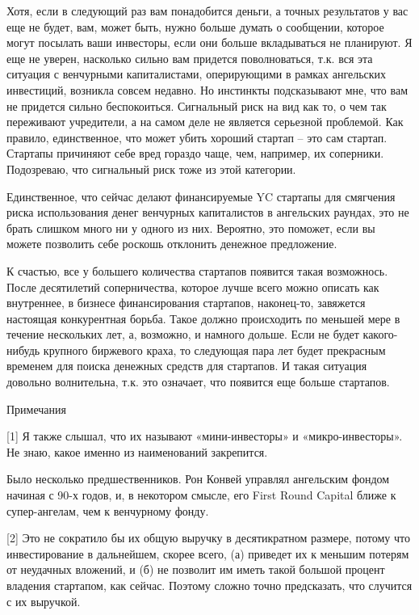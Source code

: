 \documentclass[ebook,12pt,oneside,openany]{memoir}
\begin{document}
Хотя, если в следующий раз вам понадобится деньги, а точных
результатов у вас еще не будет, вам, может быть, нужно больше думать о
сообщении, которое могут посылать ваши инвесторы, если они больше
вкладываться не планируют. Я еще не уверен, насколько сильно вам
придется поволноваться, т.к. вся эта ситуация с венчурными
капиталистами, оперирующими в рамках ангельских инвестиций, возникла
совсем недавно. Но инстинкты подсказывают мне, что вам не придется
сильно беспокоиться. Сигнальный риск на вид как то, о чем так
переживают учредители, а на самом деле не является серьезной
проблемой. Как правило, единственное, что может убить хороший стартап
– это сам стартап. Стартапы причиняют себе вред гораздо чаще, чем,
например, их соперники. Подозреваю, что сигнальный риск тоже из этой
категории.

Единственное, что сейчас делают финансируемые YC стартапы для
смягчения риска использования денег венчурных капиталистов в
ангельских раундах, это не брать слишком много ни у одного из них.
Вероятно, это поможет, если вы можете позволить себе роскошь отклонить
денежное предложение.

К счастью, все у большего количества стартапов появится такая
возможнось. После десятилетий соперничества, которое лучше всего можно
описать как внутреннее, в бизнесе финансирования стартапов,
наконец-то, завяжется настоящая конкурентная борьба. Такое должно
происходить по меньшей мере в течение нескольких лет, а, возможно, и
намного дольше. Если не будет какого-нибудь крупного биржевого краха,
то следующая пара лет будет прекрасным временем для поиска денежных
средств для стартапов. И такая ситуация довольно волнительна, т.к. это
означает, что появится еще больше стартапов.

Примечания

[1] Я также слышал, что их называют «мини-инвесторы» и
«микро-инвесторы». Не знаю, какое именно из наименований закрепится.

Было несколько предшественников. Рон Конвей управлял ангельским фондом
начиная с 90-х годов, и, в некотором смысле, его First Round Capital
ближе к супер-ангелам, чем к венчурному фонду.

[2] Это не сократило бы их общую выручку в десятикратном размере,
потому что инвестирование в дальнейшем, скорее всего, (а) приведет их
к меньшим потерям от неудачных вложений, и (б) не позволит им иметь
такой большой процент владения стартапом, как сейчас. Поэтому сложно
точно предсказать, что случится с их выручкой.
\end{document}
